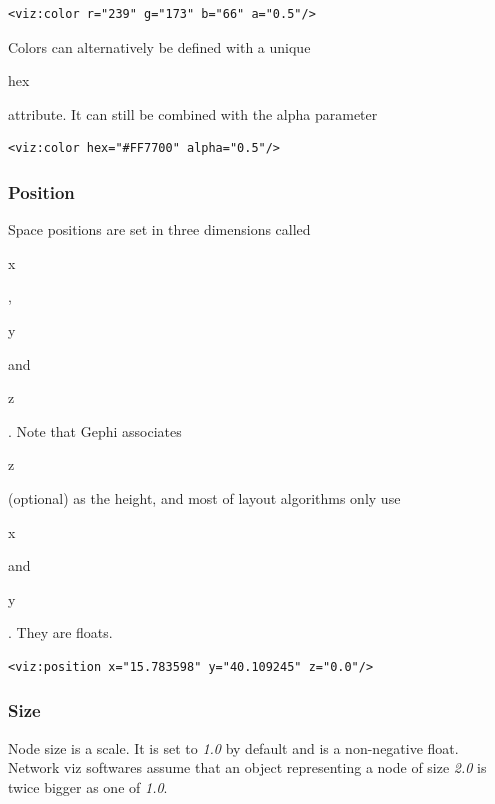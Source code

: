 \documentclass[a4paper,10pt]{article}
\begin{document}
\lstset{ style=gexf }
\begin{lstlisting}[caption={VIZ Color Declaration},label=vizcolor]
<viz:color r="239" g="173" b="66" a="0.5"/>
\end{lstlisting}

Colors can alternatively be defined with a unique \begin{footnotesize}hex\end{footnotesize} attribute. It can still be combined with the alpha parameter

\lstset{ style=gexf }
\begin{lstlisting}[caption={Color Hex Attribute},label=vizhex]
<viz:color hex="#FF7700" alpha="0.5"/>
\end{lstlisting}

\subsubsection{Position}

Space positions are set in three dimensions called \begin{footnotesize}x\end{footnotesize}, \begin{footnotesize}y\end{footnotesize} and \begin{footnotesize}z\end{footnotesize}. Note that Gephi associates \begin{footnotesize}z\end{footnotesize} (optional) as the height, and most of layout algorithms only use \begin{footnotesize}x\end{footnotesize} and \begin{footnotesize}y\end{footnotesize}. They are floats.

\lstset{ style=gexf }
\begin{lstlisting}[caption={VIZ Position Declaration},label=vizposition]
<viz:position x="15.783598" y="40.109245" z="0.0"/>
\end{lstlisting}

\subsubsection{Size}

Node size is a scale. It is set to \textit{1.0} by default and is a non-negative float. Network viz softwares assume that an object representing a node of size \textit{2.0} is twice bigger as one of \textit{1.0}.
\end{document}
